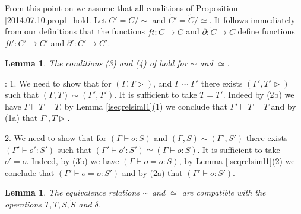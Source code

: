 \documentclass[11pt]{article}
\newenvironment{proof}{{\bf Proof}:}{\vskip 5mm }
\newtheorem{lemma}[proposition]{Lemma}
\newcommand{\llabel}[1]{\label{#1}}
\newcommand{\sr}{\rightarrow}
\newcommand{\wt}{\widetilde}
\begin{document}
%
From this point on we assume that all conditions of Proposition \ref{2014.07.10.prop1}  hold. Let $C'=C/\sim$ and $\wt{C}'=\wt{C}/\simeq$. It follows immediately from our definitions that the functions $ft:C\sr C$ and $\partial:\wt{C}\sr C$ define functions $ft':C'\sr C'$ and $\partial':\wt{C}'\sr C'$.
%
\begin{lemma}
\llabel{surjl1}
The conditions (3) and (4) of \cite[Proposition 5.4]{Csubsystems} hold for $\sim$ and $\simeq$.
\end{lemma}
%
\begin{proof}
1. We need to show that for $(\Gamma,T\rhd)$, and $\Gamma\sim\Gamma'$ there exists $(\Gamma',T'\rhd)$ such that $(\Gamma,T)\sim(\Gamma',T')$. It is sufficient to take $T=T'$. Indeed by (2b) we have $\Gamma\vdash T=T$, by Lemma \ref{iseqrelsiml1}(1) we conclude that $\Gamma'\vdash T=T$ and by (1a) that $\Gamma',T\rhd$.  

2.  We need to show that for $(\Gamma\vdash o:S)$ and $(\Gamma,S)\sim(\Gamma',S')$ there exists $(\Gamma'\vdash o':S')$ such that $(\Gamma'\vdash o':S')\simeq(\Gamma\vdash o:S)$. It is sufficient to take $o'=o$. Indeed, by (3b) we have $(\Gamma\vdash o=o:S)$, by Lemma \ref{iseqrelsiml1}(2) we conclude that $(\Gamma'\vdash o=o:S')$ and by (2a) that $(\Gamma'\vdash o:S')$. 
\end{proof}
%
\begin{lemma}
\llabel{TSetc}
The equivalence relations $\sim$ and $\simeq$ are compatible with the operations $T,\wt{T},S,\wt{S}$ and $\delta$.
\end{lemma}
%
\end{document}
